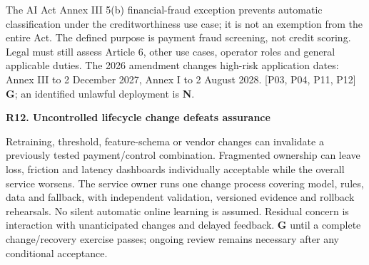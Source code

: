 \documentclass[11pt,a4paper]{article}
\newcommand{\sub}[1]{\par\vspace{2mm}\textbf{\color{ink}#1}\par}
\newcommand{\src}[1]{{\small[#1]}}
\newcommand{\risk}[2]{\sub{#1. #2}}
\begin{document}
The AI Act Annex III 5(b) financial-fraud exception prevents automatic classification under the creditworthiness use case; it is not an exemption from the entire Act. The defined purpose is payment fraud screening, not credit scoring. Legal must still assess Article 6, other use cases, operator roles and general applicable duties. The 2026 amendment changes high-risk application dates: Annex III to 2 December 2027, Annex I to 2 August 2028. \src{P03, P04, P11, P12} \textbf{G}; an identified unlawful deployment is \textbf{N}.
\risk{R12}{Uncontrolled lifecycle change defeats assurance}
Retraining, threshold, feature-schema or vendor changes can invalidate a previously tested payment/control combination. Fragmented ownership can leave loss, friction and latency dashboards individually acceptable while the overall service worsens. The service owner runs one change process covering model, rules, data and fallback, with independent validation, versioned evidence and rollback rehearsals. No silent automatic online learning is assumed. Residual concern is interaction with unanticipated changes and delayed feedback. \textbf{G} until a complete change/recovery exercise passes; ongoing review remains necessary after any conditional acceptance.
\end{document}
